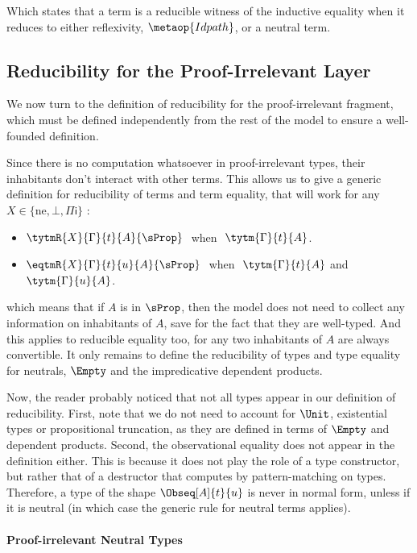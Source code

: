 Which states that a term is a reducible witness of the inductive equality when it
reduces to either reflexivity, \( \metaop{Idpath} \), or a neutral term.

\subsection{Reducibility for the Proof-Irrelevant Layer}

We now turn to the definition of reducibility for the proof-irrelevant
fragment, which must be defined independently from the rest of the model
to ensure a well-founded definition.

Since there is no computation whatsoever in proof-irrelevant types,
their inhabitants don't interact with other terms. This allows us
to give a generic definition for reducibility of terms and term
equality, that will work for any \( X \in \{ \mathrm{ne}, \bot, {\Pi \mathsf{i}}\} \) :
%
\begin{itemize}
  \item \( \tytmR{X}{\Gamma}{t}{A}{\sProp}\ \) when \(\ \tytm{\Gamma}{t}{A} \).
  \item \( \eqtmR{X}{\Gamma}{t}{u}{A}{\sProp}\ \) when \(\ \tytm{\Gamma}{t}{A} \) and \( \tytm{\Gamma}{u}{A} \).
  \end{itemize}
%
which means that if \( A \) is in \( \sProp \), then the model does not
need to collect any information on inhabitants of
\( A \), save for the fact that they are well-typed. And this applies
to reducible equality too, for any two inhabitants of \( A \) are always
convertible.
% 
It only remains to define the reducibility of types and type equality
for neutrals, $\Empty$ and the impredicative dependent products.

Now, the reader probably noticed that not all types appear in our definition
of reducibility.
% 
First, note that we do not need to account for \( \Unit \), existential types 
or propositional truncation, as they are defined in terms of \( \Empty \)
and dependent products.
%
Second, the observational equality does not appear in the definition
either.
This is because it does not play the role of a type constructor, but
rather that of a destructor that computes by pattern-matching on types.
Therefore, a type of the shape \( \Obseq[A]{t}{u} \) is never in normal
form, unless if it is neutral (in which case the generic rule for neutral
terms applies).

\paragraph{Proof-irrelevant Neutral Types}

